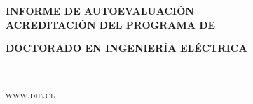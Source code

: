 \documentclass[11pt,fleqn]{book} %
\begin{document}

\begingroup
\thispagestyle{empty}
\centering
\vspace*{5cm}
\par\normalfont\fontsize{35}{35}\sffamily\selectfont
\textbf{INFORME DE AUTOEVALUACIÓN}\\
\vspace*{0.5cm}
{\Large \textbf{ACREDITACIÓN DEL PROGRAMA DE}}\par %
\vspace*{0.3cm}
{\Huge \textbf{DOCTORADO EN INGENIERÍA ELÉCTRICA}}\par %
\endgroup


\newpage
~\vfill
\thispagestyle{empty}

\noindent \textsc{www.die.cl}\\ %






\pagestyle{empty} %

\tableofcontents %


\pagestyle{fancy} %

\end{document}

